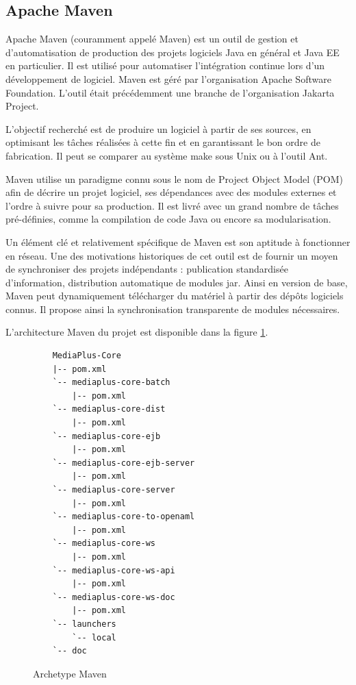 \subsection{Apache Maven}
\par Apache Maven (couramment appelé Maven) est un outil de gestion et d'automatisation de production des projets logiciels Java en général et Java EE en particulier. Il est utilisé pour automatiser l'intégration continue lors d'un développement de logiciel. Maven est géré par l'organisation Apache Software Foundation. L'outil était précédemment une branche de l'organisation Jakarta Project.
\par L'objectif recherché est de produire un logiciel à partir de ses sources, en optimisant les tâches réalisées à cette fin et en garantissant le bon ordre de fabrication. Il peut se comparer au système make sous Unix ou à l'outil Ant.
\par Maven utilise un paradigme connu sous le nom de Project Object Model (POM) afin de décrire un projet logiciel, ses dépendances avec des modules externes et l'ordre à suivre pour sa production. Il est livré avec un grand nombre de tâches pré-définies, comme la compilation de code Java ou encore sa modularisation.
\par Un élément clé et relativement spécifique de Maven est son aptitude à fonctionner en réseau. Une des motivations historiques de cet outil est de fournir un moyen de synchroniser des projets indépendants : publication standardisée d'information, distribution automatique de modules jar. Ainsi en version de base, Maven peut dynamiquement télécharger du matériel à partir des dépôts logiciels connus. Il propose ainsi la synchronisation transparente de modules nécessaires.
\par L'architecture Maven du projet est disponible dans la figure \ref{fig:mavenarch}. \\
\begin{figure}[ht]
    \begin{lstlisting}
    MediaPlus-Core
    |-- pom.xml
    `-- mediaplus-core-batch
        |-- pom.xml
    `-- mediaplus-core-dist
        |-- pom.xml
    `-- mediaplus-core-ejb
        |-- pom.xml
    `-- mediaplus-core-ejb-server
        |-- pom.xml
    `-- mediaplus-core-server
        |-- pom.xml
    `-- mediaplus-core-to-openaml
        |-- pom.xml
    `-- mediaplus-core-ws
        |-- pom.xml
    `-- mediaplus-core-ws-api
        |-- pom.xml
    `-- mediaplus-core-ws-doc
        |-- pom.xml
    `-- launchers
        `-- local
    `-- doc
    \end{lstlisting}
    \caption{Archetype Maven}
    \label{fig:mavenarch}
\end{figure}
\clearpage
